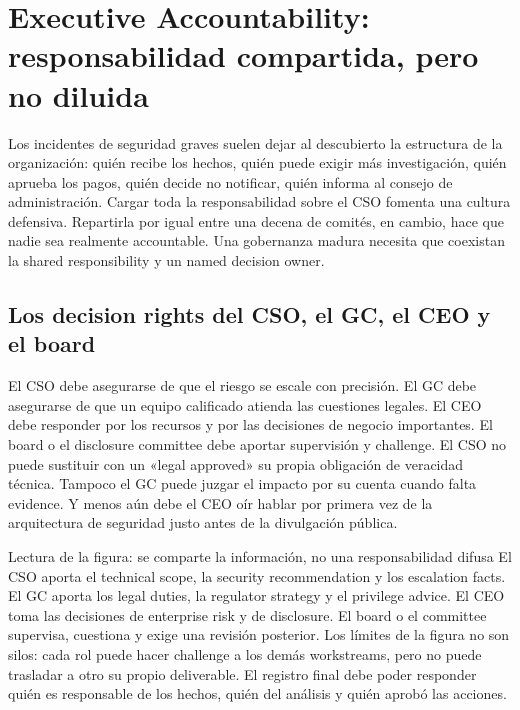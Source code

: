 \section{Executive Accountability: responsabilidad compartida, pero no diluida}

Los incidentes de seguridad graves suelen dejar al descubierto la estructura de la organización: quién recibe los hechos, quién puede exigir más investigación, quién aprueba los pagos, quién decide no notificar, quién informa al consejo de administración. Cargar toda la responsabilidad sobre el CSO fomenta una cultura defensiva. Repartirla por igual entre una decena de comités, en cambio, hace que nadie sea realmente accountable. Una gobernanza madura necesita que coexistan la shared responsibility y un named decision owner.

\subsection{Los decision rights del CSO, el GC, el CEO y el board}

El CSO debe asegurarse de que el riesgo se escale con precisión. El GC debe asegurarse de que un equipo calificado atienda las cuestiones legales. El CEO debe responder por los recursos y por las decisiones de negocio importantes. El board o el disclosure committee debe aportar supervisión y challenge. El CSO no puede sustituir con un «legal approved» su propia obligación de veracidad técnica. Tampoco el GC puede juzgar el impacto por su cuenta cuando falta evidence. Y menos aún debe el CEO oír hablar por primera vez de la arquitectura de seguridad justo antes de la divulgación pública.


\begin{knowledgebox}{Lectura de la figura: se comparte la información, no una responsabilidad difusa}
El CSO aporta el technical scope, la security recommendation y los escalation facts. El GC aporta los legal duties, la regulator strategy y el privilege advice. El CEO toma las decisiones de enterprise risk y de disclosure. El board o el committee supervisa, cuestiona y exige una revisión posterior. Los límites de la figura no son silos: cada rol puede hacer challenge a los demás workstreams, pero no puede trasladar a otro su propio deliverable. El registro final debe poder responder quién es responsable de los hechos, quién del análisis y quién aprobó las acciones.
\end{knowledgebox}

